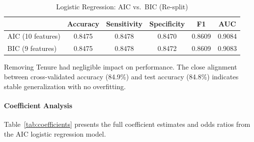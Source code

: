\documentclass[12pt]{article}
\begin{document}
\begin{table}[H]
    \centering
    \caption{Logistic Regression: AIC vs.\ BIC (Re-split)}
    \label{tab:lr_comparison}
    \begin{tabular}{lccccc}
        \toprule
        & \textbf{Accuracy} & \textbf{Sensitivity} & \textbf{Specificity} & \textbf{F1} & \textbf{AUC} \\
        \midrule
        AIC (10 features) & 0.8475 & 0.8478 & 0.8470 & 0.8609 & 0.9084 \\
        BIC (9 features)  & 0.8475 & 0.8478 & 0.8472 & 0.8609 & 0.9083 \\
        \bottomrule
    \end{tabular}
\end{table}

Removing Tenure had negligible impact on performance. The close alignment 
between cross-validated accuracy (84.9\%) and test accuracy (84.8\%) indicates 
stable generalization with no overfitting.

\paragraph{Coefficient Analysis}
Table~\ref{tab:coefficients} presents the full coefficient estimates and odds 
ratios from the AIC logistic regression model.
\end{document}
